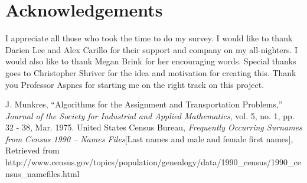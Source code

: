 \documentclass[letterpaper]{article}
\begin{document}
\section*{Acknowledgements}
I appreciate all those who took the time to do my survey.
I would like to thank Darien Lee and Alex Carillo for their support and company on my all-nighters. I would also like to
thank Megan Brink for her encouraging words. Special thanks goes to Christopher Shriver for the idea and motivation for
creating this. Thank you Professor Aspnes for starting me on the right track on this project.






\begin{thebibliography}{11}
       J. Munkres,
        ``Algorithms for the Assignment and Transportation Problems,''
        \emph{Journal of the Society for Industrial and Applied Mathematics},
        vol. 5, no. 1, pp. 32 - 38, Mar. 1975.
            United States Census Bureau,
            \emph{Frequently Occurring Surnames from Census 1990 – Names Files}[Last names and male and female first names],
            Retrieved from http://www.census.gov/topics/population/genealogy/data/1990\_census/1990\_census\_namefiles.html

\end{thebibliography}
\end{document}
